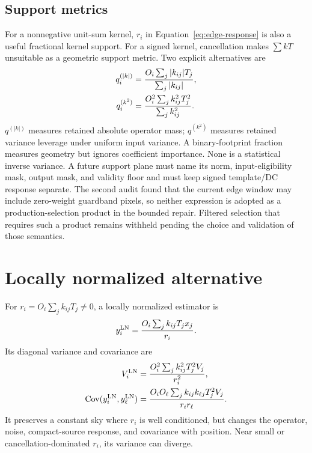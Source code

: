 \documentclass[11pt]{article}
\newcommand{\Cov}{\operatorname{Cov}}
\begin{document}
\subsection{Support metrics}

For a nonnegative unit-sum kernel, $r_i$ in
Equation~\eqref{eq:edge-response} is also a useful fractional kernel support.
For a signed kernel, cancellation makes $\sum kT$ unsuitable as a geometric
support metric.  Two explicit alternatives are
\begin{align}
 q_i^{(|k|)}&={O_i\sum_j|k_{ij}|T_j\over\sum_j|k_{ij}|},
 \label{eq:l1-support}\\
 q_i^{(k^2)}&={O_i^2\sum_jk_{ij}^2T_j^2\over\sum_jk_{ij}^2}.
 \label{eq:l2-support}
\end{align}
$q^{(|k|)}$ measures retained absolute operator mass; $q^{(k^2)}$ measures
retained variance leverage under uniform input variance.  A binary-footprint
fraction measures geometry but ignores coefficient importance.  None is a
statistical inverse variance.  A future support plane must name its norm,
input-eligibility mask, output mask, and validity floor and must keep signed
template/DC response separate.  The second audit found that the current edge
window may include zero-weight guardband pixels, so neither expression is
adopted as a production-selection product in the bounded repair.  Filtered
selection that requires such a product remains withheld pending the choice
and validation of those semantics.

\section{Locally normalized alternative}
\label{sec:local-normalization}

For $r_i=O_i\sum_jk_{ij}T_j\ne0$, a locally normalized estimator is
\begin{equation}
 y_i^{\rm LN}={O_i\sum_jk_{ij}T_jx_j\over r_i}.
 \label{eq:local-signal}
\end{equation}
Its diagonal variance and covariance are
\begin{align}
 V_{i}^{\rm LN}&={O_i^2\sum_jk_{ij}^2T_j^2V_j\over r_i^2},
 \label{eq:local-var}\\
 \Cov(y_i^{\rm LN},y_\ell^{\rm LN})
 &= {O_iO_\ell\sum_jk_{ij}k_{\ell j}T_j^2V_j\over r_ir_\ell}.
 \label{eq:local-cov}
\end{align}
It preserves a constant sky where $r_i$ is well conditioned, but changes the
operator, noise, compact-source response, and covariance with position.  Near
small or cancellation-dominated $r_i$, its variance can diverge.
\end{document}
